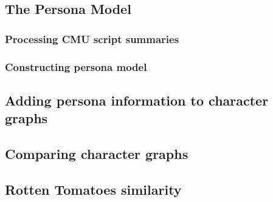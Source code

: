 \documentclass[bsc,frontabs,singlespacing,parskip]{infthesis} %
\begin{document}
\subsection{The Persona Model}
\subsubsection{Processing CMU script summaries}
\subsubsection{Constructing persona model}

\subsection{Adding persona information to character graphs}

\subsection{Comparing character graphs}

\subsection{Rotten Tomatoes similarity}



\end{document}
